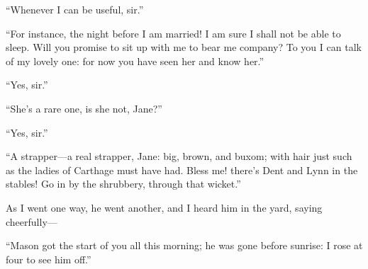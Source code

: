 \enquote{Whenever I can be useful, sir.}

\enquote{For instance, the night before I am married! I am sure I shall
	not be able to sleep. Will you promise to sit up with me to bear me
	company? To you I can talk of my lovely one: for now you have seen her
	and know her.}

\enquote{Yes, sir.}

\enquote{She's a rare one, is she not, Jane?}

\enquote{Yes, sir.}

\enquote{A strapper---a real strapper, Jane: big, brown, and buxom; with
	hair just such as the ladies of Carthage must have had. Bless me!
	there's Dent and Lynn in the stables! Go in by the shrubbery, through
	that wicket.}

As I went one way, he went another, and I heard him in the yard, saying
cheerfully---

\enquote{Mason got the start of you all this morning; he was gone before
	sunrise: I rose at four to see him off.}
